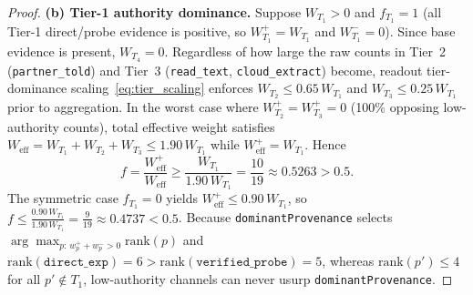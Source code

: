 \begin{proof}
\textbf{(b) Tier-1 authority dominance.}
Suppose $W_{T_1} > 0$ and $f_{T_1} = 1$ (all Tier-1 direct/probe evidence is positive, so $W_{T_1}^+ = W_{T_1}$ and $W_{T_1}^- = 0$). Since base evidence is present, $W_{T_4} = 0$. Regardless of how large the raw counts in Tier~2 (\texttt{partner\_told}) and Tier~3 (\texttt{read\_text}, \texttt{cloud\_extract}) become, readout tier-dominance scaling~\eqref{eq:tier_scaling} enforces $W_{T_2} \le 0.65\,W_{T_1}$ and $W_{T_3} \le 0.25\,W_{T_1}$ prior to aggregation. In the worst case where $W_{T_2}^+ = W_{T_3}^+ = 0$ (100\% opposing low-authority counts), total effective weight satisfies $W_{\mathrm{eff}} = W_{T_1} + W_{T_2} + W_{T_3} \le 1.90\,W_{T_1}$ while $W_{\mathrm{eff}}^+ = W_{T_1}$. Hence
\[
  f = \frac{W_{\mathrm{eff}}^+}{W_{\mathrm{eff}}} \ge \frac{W_{T_1}}{1.90\,W_{T_1}} = \frac{10}{19} \approx 0.5263 > 0.5.
\]
The symmetric case $f_{T_1} = 0$ yields $W_{\mathrm{eff}}^+ \le 0.90\,W_{T_1}$, so $f \le \frac{0.90\,W_{T_1}}{1.90\,W_{T_1}} = \frac{9}{19} \approx 0.4737 < 0.5$. Because \texttt{dominantProvenance} selects $\arg\max_{p:\,w_p^+ + w_p^- > 0} \mathrm{rank}(p)$ and $\mathrm{rank}(\texttt{direct\_exp}) = 6 > \mathrm{rank}(\texttt{verified\_probe}) = 5$, whereas $\mathrm{rank}(p') \le 4$ for all $p' \notin T_1$, low-authority channels can never usurp \texttt{dominantProvenance}.


\end{proof}
